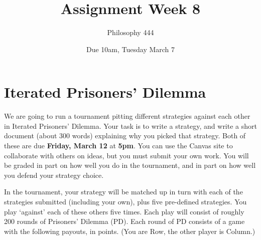 \documentclass[
  11pt,
]{article}
\title{Assignment Week 8}
\author{Philosophy 444}
\date{Due 10am, Tuesday March 7}
\begin{document}
\maketitle

\hypertarget{iterated-prisoners-dilemma}{%
\section{Iterated Prisoners' Dilemma}\label{iterated-prisoners-dilemma}}

We are going to run a tournament pitting different strategies against
each other in Iterated Prisoners' Dilemma. Your task is to write a
strategy, and write a short document (about 300 words) explaining why
you picked that strategy. Both of these are due \textbf{Friday, March
12} at \textbf{5pm}. You can use the Canvas site to collaborate with
others on ideas, but you must submit your own work. You will be graded
in part on how well you do in the tournament, and in part on how well
you defend your strategy choice.

In the tournament, your strategy will be matched up in turn with each of
the strategies submitted (including your own), plus five pre-defined
strategies. You play `against' each of these others five times. Each
play will consist of roughly 200 rounds of Prisoners' Dilemma (PD). Each
round of PD consists of a game with the following payouts, in points.
(You are Row, the other player is Column.)

 
  \providecommand{\huxb}[2]{\arrayrulecolor[RGB]{#1}\global\arrayrulewidth=#2pt}
  \providecommand{\huxvb}[2]{\color[RGB]{#1}\vrule width #2pt}
  \providecommand{\huxtpad}[1]{\rule{0pt}{#1}}
  \providecommand{\huxbpad}[1]{\rule[-#1]{0pt}{#1}}
\end{document}
